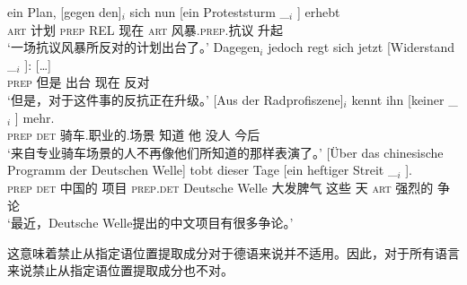 \begin{sloppypar}
\ex 
\gll ein Plan, [gegen den]$_i$ sich nun [ein Proteststurm \_$_i$ ] erhebt\footnotemark\\
     \textsc{art} 计划 \spacebr{}\textsc{prep} REL  现在 \spacebr{}\textsc{art} 风暴.\textsc{prep}.抗议 {} {} 升起\\
\glt `一场抗议风暴所反对的计划出台了。'
\ex 
\gll {}Dagegen$_i$ jedoch regt sich jetzt [Widerstand \_$_i$ ]: [\ldots]\footnotemark\\
	{}\textsc{prep} 但是 出台  现在 \spacebr{}反对 {}\\
\glt `但是，对于这件事的反抗正在升级。'
\largerpage[2]
\ex
\gll {}[Aus der Radprofiszene]$_i$ kennt ihn [keiner \_$_i$ ] mehr.\footnotemark\\
	 {}\spacebr{}\textsc{prep} \textsc{det} 骑车.职业的.场景 知道 他 \spacebr{}没人 {} {} 今后\\
\glt `来自专业骑车场景的人不再像他们所知道的那样表演了。'
\ex 
\gll {}[Über das chinesische Programm der Deutschen Welle] tobt dieser Tage [ein heftiger Streit \_$_i$ ].\footnotemark\\
     \spacebr{}\textsc{prep} \textsc{det} 中国的 项目 \textsc{prep}.\textsc{det} Deutsche Welle 大发脾气 这些 天 \spacebr{}\textsc{art} 强烈的 争论\\
\glt `最近，Deutsche Welle提出的中文项目有很多争论。'
\zl
\end{sloppypar}

\noindent
这意味着禁止从指定语位置提取成分对于德语来说并不适用。因此，对于所有语言来说禁止从指定语位置提取成分也不对。


